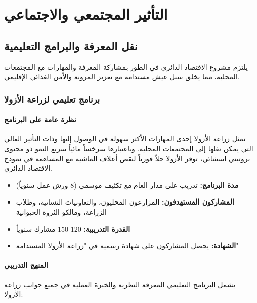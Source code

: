\section{التأثير المجتمعي والاجتماعي}

\subsection{نقل المعرفة والبرامج التعليمية}

يلتزم مشروع الاقتصاد الدائري في الطور بمشاركة المعرفة والمهارات مع المجتمعات المحلية، مما يخلق سبل عيش مستدامة مع تعزيز المرونة والأمن الغذائي الإقليمي.

\subsubsection{برنامج تعليمي لزراعة الأزولا}

\paragraph{نظرة عامة على البرنامج}
تمثل زراعة الأزولا إحدى المهارات الأكثر سهولة في الوصول إليها وذات التأثير العالي التي يمكن نقلها إلى المجتمعات المحلية. وباعتبارها سرخساً مائياً سريع النمو ذو محتوى بروتيني استثنائي، توفر الأزولا حلاً فورياً لنقص أعلاف الماشية مع المساهمة في نموذج الاقتصاد الدائري.

\begin{itemize}
    \item \textbf{مدة البرنامج:} تدريب على مدار العام مع تكثيف موسمي (8 ورش عمل سنوياً)
    \item \textbf{المشاركون المستهدفون:} المزارعون المحليون، والتعاونيات النسائية، وطلاب الزراعة، ومالكو الثروة الحيوانية
    \item \textbf{القدرة التدريبية:} 120-150 مشارك سنوياً
    \item \textbf{الشهادة:} يحصل المشاركون على شهادة رسمية في "زراعة الأزولا المستدامة"
\end{itemize}

\paragraph{المنهج التدريبي}
يشمل البرنامج التعليمي المعرفة النظرية والخبرة العملية في جميع جوانب زراعة الأزولا:

